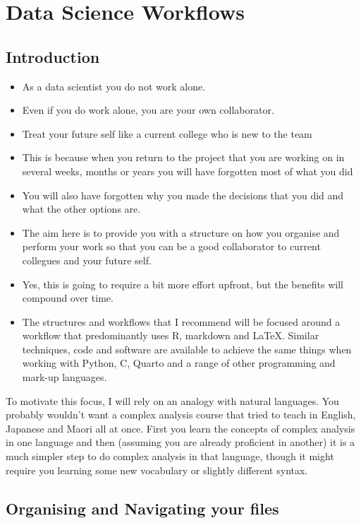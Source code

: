 \documentclass[
  12pt,
]{book}
\theoremstyle{definition}
\theoremstyle{definition}
\theoremstyle{definition}
\theoremstyle{definition}
\theoremstyle{remark}
\begin{document}
\hypertarget{workflows}{%
\chapter{Data Science Workflows}\label{workflows}}

\hypertarget{introduction}{%
\section{Introduction}\label{introduction}}

\begin{itemize}
\item
  As a data scientist you do not work alone.
\item
  Even if you do work alone, you are your own collaborator.
\item
  Treat your future self like a current college who is new to the team
\item
  This is because when you return to the project that you are working on in several weeks, months or years you will have forgotten most of what you did
\item
  You will also have forgotten why you made the decisions that you did and what the other options are.
\item
  The aim here is to provide you with a structure on how you organise and perform your work so that you can be a good collaborator to current collegues and your future self.
\item
  Yes, this is going to require a bit more effort upfront, but the benefits will compound over time.
\item
  The structures and workflows that I recommend will be focused around a workflow that predominantly uses R, markdown and LaTeX. Similar techniques, code and software are available to achieve the same things when working with Python, C, Quarto and a range of other programming and mark-up languages.
\end{itemize}

To motivate this focus, I will rely on an analogy with natural languages. You probably wouldn't want a complex analysis course that tried to teach in English, Japanese and Maori all at once. First you learn the concepts of complex analysis in one language and then (assuming you are already proficient in another) it is a much simpler step to do complex analysis in that language, though it might require you learning some new vocabulary or slightly different syntax.

\hypertarget{organising-and-navigating-your-files}{%
\section{Organising and Navigating your files}\label{organising-and-navigating-your-files}}
\end{document}
